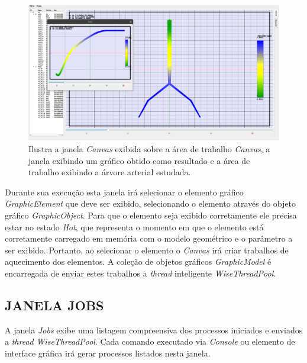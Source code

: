 \begin{figure}[!htbp]
	\centering
	\includegraphics[width=\linewidth]{Figures/IGU_025.png}
	\caption{Ilustra a janela \textit{Canvas} exibida sobre a área de trabalho \textit{Canvas}, a janela exibindo um gráfico obtido como resultado e a área de trabalho exibindo a árvore arterial estudada.}
	\label{fig:canvas}
\end{figure}

Durante sua execução esta janela irá selecionar o elemento gráfico \textit{GraphicElement} que deve ser exibido, selecionando o elemento através do objeto gráfico \textit{GraphicObject}. Para que o elemento seja exibido corretamente ele precisa estar no estado \textit{Hot}, que representa o momento em que o elemento está corretamente carregado em memória com o modelo geométrico e o parâmetro a ser exibido. Portanto, ao selecionar o elemento o \textit{Canvas} irá criar trabalhos de aquecimento dos elementos. A coleção de objetos gráficos \textit{GraphicModel} é encarregada de enviar estes trabalhos a \textit{thread} inteligente \textit{WiseThreadPool}.

\subsection{JANELA JOBS}\label{sec:janela_jobs}

A janela \textit{Jobs} exibe uma listagem compreensiva dos processos iniciados e enviados a \textit{thread} \textit{WiseThreadPool}. Cada comando executado via \textit{Console} ou elemento de interface gráfica irá gerar processos listados nesta janela.

